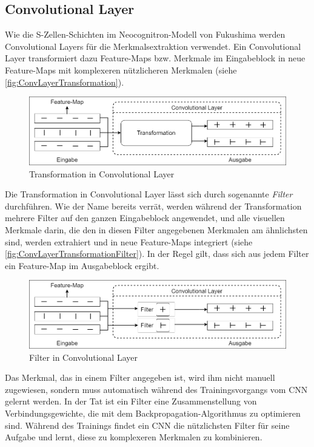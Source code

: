 \subsection{Convolutional Layer}

Wie die S-Zellen-Schichten im Neocognitron-Modell von Fukushima werden Convolutional Layers für die Merkmalsextraktion verwendet. Ein Convolutional Layer transformiert dazu Feature-Maps bzw. Merkmale im Eingabeblock in neue Feature-Maps mit komplexeren nützlicheren Merkmalen (siehe \autoref{fig:ConvLayerTransformation}).
	
\begin{figure}[!hb]
	\centering
	\includegraphics[width=\linewidth]{images/ConvLayerTransformation}
	\caption{Transformation in Convolutional Layer}
	\label{fig:ConvLayerTransformation}
\end{figure}
	
Die Transformation in Convolutional Layer lässt sich durch sogenannte \emph{Filter} durchführen. Wie der Name bereits verrät, werden während der Transformation mehrere Filter auf den ganzen Eingabeblock angewendet, und alle visuellen Merkmale darin, die den in diesen Filter angegebenen Merkmalen am ähnlichsten sind, werden extrahiert und in neue Feature-Maps integriert (siehe \autoref{fig:ConvLayerTransformationFilter}). In der Regel gilt, dass sich aus jedem Filter ein Feature-Map im Ausgabeblock ergibt.
	
\begin{figure}[h]
	\centering
	\includegraphics[width=\linewidth]{images/ConvLayerTransformationFilter}
	\caption{Filter in Convolutional Layer}
	\label{fig:ConvLayerTransformationFilter}
\end{figure}

Das Merkmal, das in einem Filter angegeben ist, wird ihm nicht manuell zugewiesen, sondern muss automatisch während des Trainingsvorgangs vom CNN gelernt werden. In der Tat ist ein Filter eine Zusammenstellung von Verbindungsgewichte, die mit dem Backpropagation-Algorithmus zu optimieren sind. Während des Trainings findet ein CNN die nützlichsten Filter für seine Aufgabe und lernt, diese zu komplexeren Merkmalen zu kombinieren.

